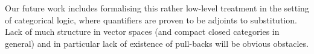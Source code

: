 Our future work includes formalising this rather low-level treatment in the setting of categorical logic, where quantifiers are proven to be adjoints to substitution. Lack of much structure in vector spaces (and compact closed categories in general) and in particular lack of existence of pull-backs will be obvious obstacles. 



